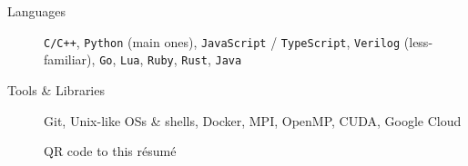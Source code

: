 \documentclass[12pt, a4paper]{article}
\begin{document}
\begin{description}
\item[Languages] \texttt{C/C++}, \texttt{Python} (main ones), \texttt{JavaScript} / \texttt{TypeScript}, \texttt{Verilog} (less-familiar), \texttt{Go}, \texttt{Lua}, \texttt{Ruby}, \texttt{Rust}, \texttt{Java}
\item[Tools \& Libraries] \textsf{Git}, \textsf{Unix}-like OSs \& shells, \textsf{Docker}, \textsf{MPI}, \textsf{OpenMP}, \textsf{CUDA}, \textsf{Google Cloud}
\end{description}

\vfill\vfill
\begin{figure}[htbp]
\centering
{}
\caption{QR code to this r\'{e}sum\'{e}}
\label{fig:qr}
\end{figure}
\vfill\vfill\vfill
\end{document}
